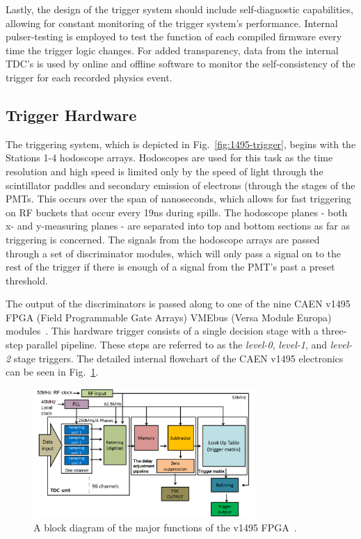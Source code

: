 Lastly, the design of the trigger system should include self-diagnostic capabilities, allowing for constant monitoring of the trigger system's performance. Internal pulser-testing is employed to test the function of each compiled firmware every time the trigger logic changes. For added transparency, data from the internal TDC's is used by online and offline software to monitor the self-consistency of the trigger for each recorded physics event.

\subsection{Trigger Hardware}

The triggering system, which is depicted in Fig.~\ref{fig:1495-trigger}, begins with the Stations 1-4 hodoscope arrays. Hodoscopes are used for this task as the time resolution and high speed is limited only by the speed of light through the scintillator paddles and secondary emission of electrons (through the stages of the PMTs. This occurs over the span of nanoseconds, which allows for fast triggering on RF buckets that occur every 19ns during spills. The hodoscope planes - both x- and y-measuring planes - are separated into top and bottom sections as far as triggering is concerned. The signals from the hodoscope arrays are passed through a set of discriminator modules, which will only pass a signal on to the rest of the trigger if there is enough of a signal from the PMT's past a preset threshold.

The output of the discriminators is passed along to one of the nine CAEN v1495 FPGA (Field Programmable Gate Arrays) VMEbus (Versa Module Europa) modules~\cite{caen:v1495}. This hardware trigger consists of a single decision stage with a three-step parallel pipeline. These steps are referred to as the \emph{level-0}, \emph{level-1}, and \emph{level-2} stage triggers. The detailed internal flowchart of the CAEN v1495 electronics can be seen in Fig.~\ref{fig:v1495-internal}.

\begin{figure}
	\centering
	\includegraphics[width=0.75\textwidth]{figures/apparatus/trigger-block-diagram.png}
	\caption{A block diagram of the major functions of the v1495 FPGA~\cite{Shiu:2015ura}.}
	\label{fig:v1495-internal}
\end{figure}

